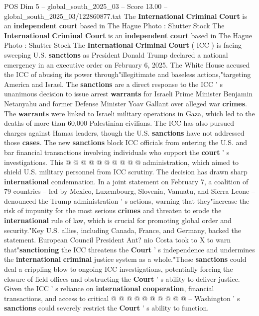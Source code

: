 \begin{textsample}{POS Dim 5 – global\_south\_2025\_03 – Score 13.00 – global\_south\_2025\_03/122860877.txt}  \label{ex:f5_pos_188}
The \textbf{International} \textbf{Criminal} \textbf{Court} is an \textbf{independent} \textbf{court} based in The Hague Photo : Shutter Stock The \textbf{International} \textbf{Criminal} \textbf{Court} is an \textbf{independent} \textbf{court} based in The Hague Photo : Shutter Stock The \textbf{International} \textbf{Criminal} \textbf{Court} ( ICC ) is facing sweeping U.S. \textbf{sanctions} as President Donald Trump declared a national emergency in an executive order on February 6, 2025.
The White House accused the ICC of abusing its power through"illegitimate and baseless actions,"targeting America and Israel.
The \textbf{sanctions} are a direct response to the ICC ' s unanimous decision to issue arrest \textbf{warrants} for Israeli Prime Minister Benjamin Netanyahu and former Defense Minister Yoav Gallant over alleged war \textbf{crimes}.
The \textbf{warrants} were linked to Israeli military operations in Gaza, which led to the deaths of more than 60,000 Palestinian civilians.
The ICC has also pursued charges against Hamas leaders, though the U.S. \textbf{sanctions} have not addressed those \textbf{cases}.
The new \textbf{sanctions} block ICC officials from entering the U.S. and bar financial transactions involving individuals who support the \textbf{court} ' s investigations.
This @ @ @ @ @ @ @ @ @ @ administration, which aimed to shield U.S. military personnel from ICC scrutiny.
The decision has drawn sharp \textbf{international} condemnation.
In a joint statement on February 7, a coalition of 79 countries -- led by Mexico, Luxembourg, Slovenia, Vanuatu, and Sierra Leone -- denounced the Trump administration ' s actions, warning that they"increase the risk of impunity for the most serious \textbf{crimes} and threaten to erode the \textbf{international} rule of law, which is crucial for promoting global order and security."Key U.S. allies, including Canada, France, and Germany, backed the statement.
European Council President Ant? nio Costa took to X to warn that"\textbf{sanctioning} the ICC threatens the \textbf{Court} ' s independence and undermines the \textbf{international} \textbf{criminal} justice system as a whole."These \textbf{sanctions} could deal a crippling blow to ongoing ICC investigations, potentially forcing the closure of field offices and obstructing the \textbf{Court} ' s ability to deliver justice.
Given the ICC ' s reliance on \textbf{international} \textbf{cooperation}, financial transactions, and access to critical @ @ @ @ @ @ @ @ @ @ -- Washington ' s \textbf{sanctions} could severely restrict the \textbf{Court} ' s ability to function.

\end{textsample}
